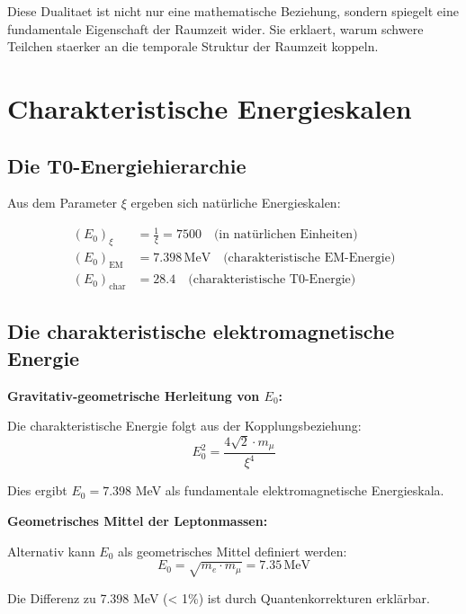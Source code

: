 \documentclass[12pt,a4paper]{article}
\newcommand{\xipar}{\xi}
\begin{document}
Diese Dualitaet ist nicht nur eine mathematische Beziehung, sondern spiegelt eine fundamentale Eigenschaft der Raumzeit wider. Sie erklaert, warum schwere Teilchen staerker an die temporale Struktur der Raumzeit koppeln.
	
	\section{Charakteristische Energieskalen}
	
	\subsection{Die T0-Energiehierarchie}
	
	Aus dem Parameter $\xipar$ ergeben sich natürliche Energieskalen:
	
	\begin{align}
		(E_0)_{\xipar} &= \frac{1}{\xipar} = 7500 \quad \text{(in natürlichen Einheiten)} \\
		(E_0)_{\text{EM}} &= 7.398\,\mathrm{MeV} \quad \text{(charakteristische EM-Energie)} \\
		(E_0)_{\text{char}} &= 28.4 \quad \text{(charakteristische T0-Energie)}
	\end{align}
	
	\subsection{Die charakteristische elektromagnetische Energie}
	
	\begin{keyresult}
		\textbf{Gravitativ-geometrische Herleitung von $E_0$:}
		
		Die charakteristische Energie folgt aus der Kopplungsbeziehung:
		\begin{equation}
			E_0^2 = \frac{4\sqrt{2} \cdot m_\mu}{\xipar^4}
		\end{equation}
		
		Dies ergibt $E_0 = 7.398$ MeV als fundamentale elektromagnetische Energieskala.
	\end{keyresult}
	
	\begin{alternative}
		\textbf{Geometrisches Mittel der Leptonmassen:}
		
		Alternativ kann $E_0$ als geometrisches Mittel definiert werden:
		\begin{equation}
			E_0 = \sqrt{m_e \cdot m_\mu} = 7.35\,\mathrm{MeV}
		\end{equation}
		
		Die Differenz zu 7.398 MeV (< 1\%) ist durch Quantenkorrekturen erklärbar.
	\end{alternative}
	
\end{document}
